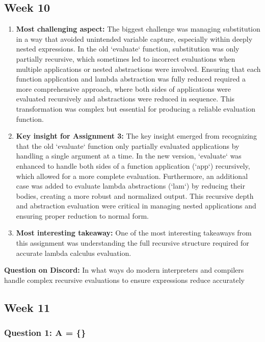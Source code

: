 \documentclass{article}
\theoremstyle{theorem}
\theoremstyle{definition}
\theoremstyle{remark}
\begin{document}
\subsection{Week 10}


\begin{enumerate}
    \item \textbf{Most challenging aspect:} The biggest challenge was managing substitution in a way that avoided unintended variable capture, especially within deeply nested expressions. In the old `evaluate` function, substitution was only partially recursive, which sometimes led to incorrect evaluations when multiple applications or nested abstractions were involved. Ensuring that each function application and lambda abstraction was fully reduced required a more comprehensive approach, where both sides of applications were evaluated recursively and abstractions were reduced in sequence. This transformation was complex but essential for producing a reliable evaluation function.

    \item \textbf{Key insight for Assignment 3:} The key insight emerged from recognizing that the old `evaluate` function only partially evaluated applications by handling a single argument at a time. In the new version, `evaluate` was enhanced to handle both sides of a function application (`app`) recursively, which allowed for a more complete evaluation. Furthermore, an additional case was added to evaluate lambda abstractions (`lam`) by reducing their bodies, creating a more robust and normalized output. This recursive depth and abstraction evaluation were critical in managing nested applications and ensuring proper reduction to normal form.

    \item \textbf{Most interesting takeaway:} One of the most interesting takeaways from this assignment was understanding the full recursive structure required for accurate lambda calculus evaluation.
\end{enumerate}

\noindent \textbf{Question on Discord:} In what ways do modern interpreters and compilers handle complex recursive evaluations to ensure expressions reduce accurately


\subsection{Week 11}

\subsubsection*{Question 1: A = \{\}}
\end{document}
